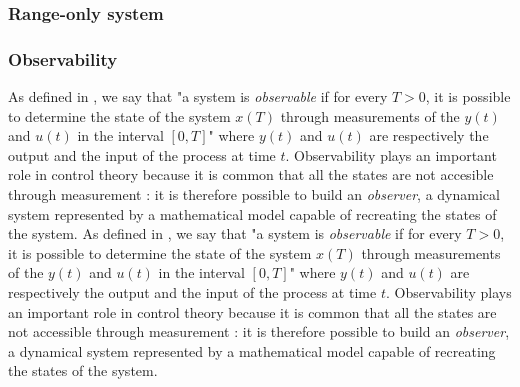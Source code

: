 \subsubsection{Range-only system}


\subsubsection{Observability}

As defined in \parencite{astrom_feedback_2021}, we say that "a system is \textit{observable} if for every $T>0$, it is possible to determine the state of the system $x(T)$ through measurements of the $y(t)$ and $u(t)$ in the interval $[0,T]$" where $y(t)$ and $u(t)$ are respectively the output and the input of the process at time $t$. Observability plays an important role in control theory because it is common that all the states are not accesible through measurement : it is therefore possible to build an \textit{observer}, a dynamical system represented by a mathematical model capable of recreating the states of the system. 
As defined in \parencite{astrom_feedback_2021}, we say that "a system is \textit{observable} if for every $T>0$, it is possible to determine the state of the system $x(T)$ through measurements of the $y(t)$ and $u(t)$ in the interval $[0,T]$" where $y(t)$ and $u(t)$ are respectively the output and the input of the process at time $t$. Observability plays an important role in control theory because it is common that all the states are not accessible through measurement : it is therefore possible to build an \textit{observer}, a dynamical system represented by a mathematical model capable of recreating the states of the system. 
\\

